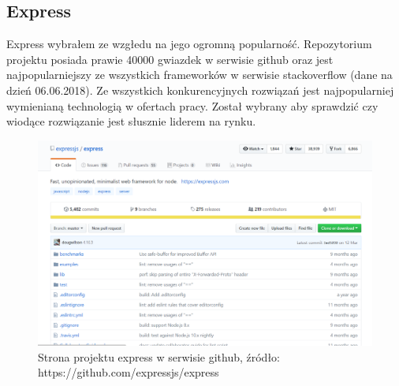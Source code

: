 \documentclass[12pt]{report}
\begin{document}
    \subsection{Express}
      Express wybrałem ze wzgłedu na jego ogromną popularność.
      Repozytorium projektu posiada prawie 40000 gwiazdek w serwisie github oraz jest najpopularniejszy ze wszystkich frameworków w serwisie stackoverflow (dane na dzień 06.06.2018).
      Ze wszystkich konkurencyjnych rozwiązań jest najpopularniej wymienianą technologią w ofertach pracy.
      Został wybrany aby sprawdzić czy wiodące rozwiązanie jest słusznie liderem na rynku.
      \begin{figure}[!hb]
        \centering
        \includegraphics[width=\textwidth,height=\textheight,keepaspectratio]{express.png} 
        \caption{Strona projektu express w serwisie github, źródło: https://github.com/expressjs/express}
      \end{figure}
\end{document}

